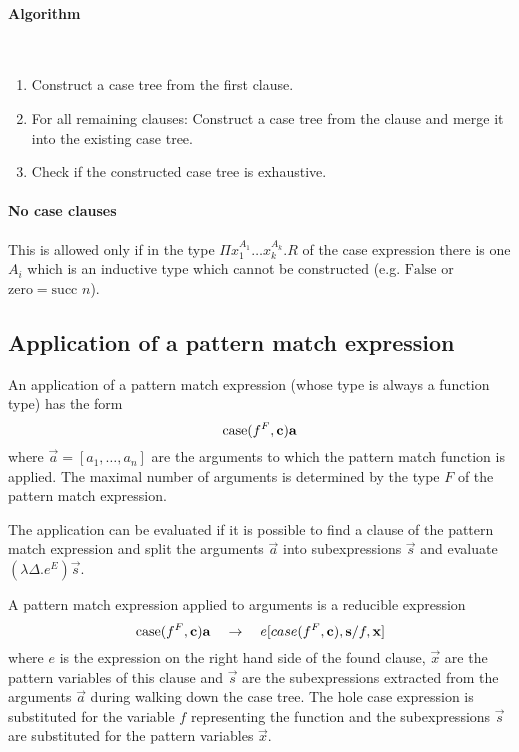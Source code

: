 \paragraph{Algorithm}

\ \begin{enumerate}
    \item Construct a case tree from the first clause.

    \item For all remaining clauses: Construct a case tree from the clause and merge it
        into the existing case tree.

    \item Check if the constructed case tree is exhaustive.
\end{enumerate}

\paragraph{No case clauses} This is allowed only if in the type $\Pi x_1^{A_1}
\ldots x_k^{A_k}. R$ of the case expression there is one $A_i$ which is an
inductive type which cannot be constructed (e.g. $\text{False}$ or $\text{zero}
= \text{succ } n$).







\subsection{Application of a pattern match expression}

An application of a pattern match expression (whose type is always a function
type) has the form
$$
{\text{case}}(f^F, {\mathbf c}) {\mathbf a}
$$
where $\vec a = [a_1, \ldots, a_n]$ are the arguments to which the pattern match
function is applied. The maximal number of arguments is determined by the type
$F$ of the pattern match expression.

The application can be evaluated if it is possible to find a clause of the
pattern match expression and split the arguments $\vec a$ into subexpressions
$\vec s$ and evaluate $(\lambda \Delta. e^E) \vec s$.

A pattern match expression applied to arguments is a reducible expression
$$
{\text{case}}(f^F, {\mathbf c}) {\mathbf a} \quad\to\quad e[case(f^F, {\mathbf c}), {\mathbf s} / f, {\mathbf x}]
$$
where $e$ is the expression on the right hand side of the found clause, $\vec x$
are the pattern variables of this clause and $\vec s$ are the subexpressions
extracted from the arguments $\vec a$ during walking down the case tree. The
hole case expression is substituted for the variable $f$ representing the
function and the subexpressions $\vec s$ are substituted for the pattern
variables $\vec x$.




